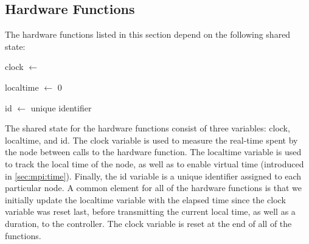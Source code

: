 

\subsection{Hardware Functions}\label{sec:hwfuncspseudo}
The hardware functions listed in this section depend on the following shared state: \smallbreak

clock $\leftarrow$ \Now

localtime $\leftarrow$ 0

id $\leftarrow$ unique identifier 
\smallbreak





%
% 

The shared state for the hardware functions consist of three variables: clock, localtime, and id. The clock variable is used to measure the real-time spent by the node between calls to the hardware function. The localtime variable is used to track the local time of the node, as well as to enable virtual time (introduced in \autoref{sec:mpi:time}). Finally, the id variable is a unique identifier assigned to each particular node. A common element for all of the hardware functions is that we initially update the localtime variable with the elapsed time since the clock variable was reset last, before transmitting the current local time, as well as a duration, to the controller. The clock variable is reset at the end of all of the functions.\medbreak

